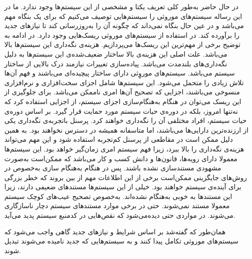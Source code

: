 
در حال حاضر به‌طور کلی تعریف یکتا و مشخصی از این سیستم‌ها وجود ندارد. ما در این رساله سیستم‌های موروثی را سیستم‌هایی توصیف می‌کنیم که برای یک بنگاه مهم می‌باشد و در عین حال بنگاه نمی‌داند که چگونه آن را به‌روزرسانی کند تا نیازهای جدید را برآورده کند. 
در استفاده از سیستم‌های موروثی ریسک‌هایی وجود دارد. در ادامه به توضیح برخی از مهم‌ترین این ریسک‌ها می‌پردازیم.
 هزینه‌ی نگه‌داری این سیستم‌ها بالا می‌باشد. علت اصلی این هزینه‌ی بالا ساختار ضعیف‌شده‌ی این سیستم‌ها به دلیل نگه‌داری‌های بلندمدت می‌باشد.
 پیاده‌سازی تغییرات نیازمند درک بالایی از ساختار سیستم می‌باشد. سیستم‌های موروٍثی دارای ساختار پیچیده‌ای می‌باشند و فهم آن‌ها تلاش زیادی را متحمل می‌شود.
 این سیستم‌ها شامل اجزای سخت‌افزاری و نرم‌افزاری منسوخی می‌باشند، اجزایی که تصحیح آن‌ها امری ناممکن می‌باشد. برای جلوگیری از این ریسک می‌توان در هنگام به‌هنگام‌سازی اجزای سیستم، از اجزایی استفاده کرد که نه‌تنها امروز، بلکه در دوره‌ی حیات سیستم مورد حمایت قرار گیرد.
 بر اساس دوره‌ی حیات سیستم، افراد مختلفی آن را نگه‌داری خواهند کرد. پرسنل باتجربه‌ی نگه‌داری یکی از ارزنده‌ترین دارایی‌ها می‌باشند، اما متاسفانه همیشه در دسترس نخواهند بود. به همین دلیل ممکن است در مقاطعی از پرسنل کم‌تجربه‌ استفاده شود و این مهم می‌تواند هزینه‌ی نگه‌داری را بالا ببرد، زیرا فهم سیستم امری زمان‌گیر خواهد بود.
 این سیستم‌ها معمولا دارای رویه‌ها، قانون‌ها و دانش کسب‌ و کار می‌باشد که ممکن‌است به‌صورت مشهودی مستندسازی نشده باشند. پس در هنگام به‌هنگام سازی به‌خصوص در روش‌های جایگزینی ممکن‌است برخی از این اطلاعات مهم از بین بروند که خطر بزرگی برای آینده‌ی سیستم خواهند بود.
 خیلی از این سیستم‌ها مستندهای ضعیفی دارند، زیرا این مستند‌ها به خوبی به‌هنگام نشده‌اند. به‌خصوص تصحیح عیب‌های کوچک سیستم معمولا مستند نمی‌شوند. حتی در برخی موارد مستند‌های سیستم دچار ناسازگاری می‌شوند. در مواردی حتی دیده‌می‌شود که نقص‌هایی در کدمنبع سیستم پدید می‌آید.  

همان‌طور که گفته‌شد بر اساس شرایط و نیازهای جدید گاهی واجب می‌شود که سیستم‌های موروثی تکامل پیدا کنند و به سیستم‌هایی که جدید نامیده می‌شوند تبدیل شوند.

